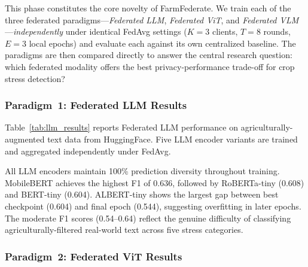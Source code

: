 \documentclass[10pt,journal,compsoc]{IEEEtran}
\begin{document}
This phase constitutes the core novelty of FarmFederate. We train each of the three federated paradigms---\textit{Federated LLM}, \textit{Federated ViT}, and \textit{Federated VLM}---\emph{independently} under identical FedAvg settings ($K{=}3$ clients, $T{=}8$ rounds, $E{=}3$ local epochs) and evaluate each against its own centralized baseline. The paradigms are then compared directly to answer the central research question: which federated modality offers the best privacy-performance trade-off for crop stress detection?

\subsubsection{Paradigm~1: Federated LLM Results}

Table~\ref{tab:llm_results} reports Federated LLM performance on agriculturally-augmented text data from HuggingFace. Five LLM encoder variants are trained and aggregated independently under FedAvg.

\begin{table}[htbp]
\centering
\caption{LLM Encoder Performance (Real HuggingFace Text)}
\label{tab:llm_results}
\small
{}
\end{table}

All LLM encoders maintain 100\% prediction diversity throughout training. MobileBERT achieves the highest F1 of 0.636, followed by RoBERTa-tiny (0.608) and BERT-tiny (0.604). ALBERT-tiny shows the largest gap between best checkpoint (0.604) and final epoch (0.544), suggesting overfitting in later epochs. The moderate F1 scores (0.54--0.64) reflect the genuine difficulty of classifying agriculturally-filtered real-world text across five stress categories.

\subsubsection{Paradigm~2: Federated ViT Results}
\end{document}
